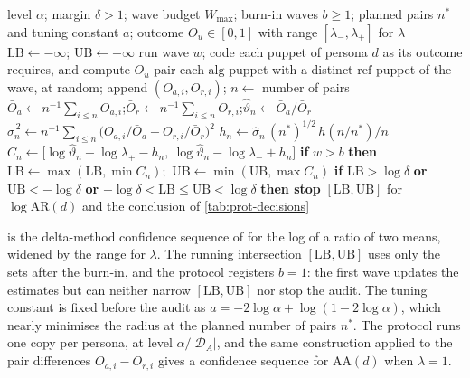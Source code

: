 \begin{algorithm}[tbp]
\caption{Anytime-valid audit of $\mathrm{AR}(d)$ for one persona, from a puppet outcome $O_u$}\label{alg:sequential}
\begin{algorithmic}[1]
\Require level $\alpha$; margin $\delta>1$; wave budget $W_{\max}$; burn-in waves $b\ge1$; planned pairs $n^\ast$ and tuning constant $a$; outcome $O_u\in[0,1]$ with range $[\lambda_-,\lambda_+]$ for $\lambda$
\State $\mathrm{LB}\gets-\infty$; $\mathrm{UB}\gets+\infty$
  \State run wave $w$; code each puppet of persona $d$ as its outcome requires, and compute $O_u$
  \State pair each $\mathrm{alg}$ puppet with a distinct $\mathrm{ref}$ puppet of the wave, at random; append $(O_{a,i},O_{r,i})$; $n\gets$ number of pairs
  \State $\bar O_a\gets n^{-1}\sum_{i\le n}O_{a,i}$;\quad $\bar O_r\gets n^{-1}\sum_{i\le n}O_{r,i}$;\quad $\widehat\vartheta_n\gets\bar O_a/\bar O_r$
  \State $\widehat\sigma_n^{\,2}\gets n^{-1}\sum_{i\le n}\bigl(O_{a,i}/\bar O_a-O_{r,i}/\bar O_r\bigr)^2$ 
  \State $h_n\gets\widehat\sigma_n\,(n^\ast)^{1/2}\,h(n/n^\ast)/n$ 
  \State $C_n\gets\bigl[\log\widehat\vartheta_n-\log\lambda_+-h_n,\ \log\widehat\vartheta_n-\log\lambda_-+h_n\bigr]$
  \State \textbf{if} $w>b$ \textbf{then} $\mathrm{LB}\gets\max(\mathrm{LB},\min C_n)$;\ $\mathrm{UB}\gets\min(\mathrm{UB},\max C_n)$ 
  \State \textbf{if} $\mathrm{LB}>\log\delta$ \textbf{or} $\mathrm{UB}<-\log\delta$ \textbf{or} $-\log\delta<\mathrm{LB}\le\mathrm{UB}<\log\delta$ \textbf{then stop} 
\EndFor
\State \Return $[\mathrm{LB},\mathrm{UB}]$ for $\log\mathrm{AR}(d)$ and the conclusion of \cref{tab:prot-decisions}
\end{algorithmic}
\end{algorithm}

 is the delta-method confidence sequence of \citet{waudbysmith2024asymp} for the log of a ratio of two means, widened by the range for $\lambda$. The running intersection $[\mathrm{LB},\mathrm{UB}]$ uses only the sets after the burn-in, and the protocol registers $b=1$: the first wave updates the estimates but can neither narrow $[\mathrm{LB},\mathrm{UB}]$ nor stop the audit. The tuning constant is fixed before the audit as $a=-2\log\alpha+\log(1-2\log\alpha)$, which nearly minimises the radius at the planned number of pairs $n^\ast$. The protocol runs one copy per persona, at level $\alpha/|\mathcal D_A|$, and the same construction applied to the pair differences $O_{a,i}-O_{r,i}$ gives a confidence sequence for $\mathrm{AA}(d)$ when $\lambda=1$.

